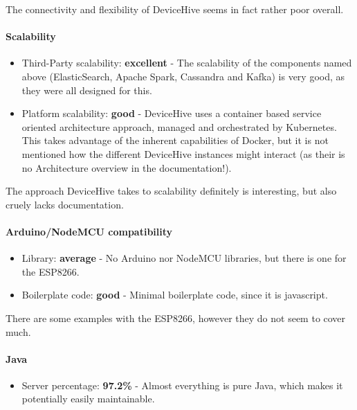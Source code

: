 \documentclass{article}
\begin{document}
The connectivity and flexibility of DeviceHive seems in fact rather poor overall.

\paragraph{Scalability}

\begin{itemize}
\item Third-Party scalability: \textbf{excellent} - The scalability of the components named above (ElasticSearch, Apache Spark, Cassandra and Kafka) is very good, as they were all designed for this.
\item Platform scalability: \textbf{good} - DeviceHive uses a container based service oriented architecture approach, managed and orchestrated by Kubernetes. This takes advantage of the inherent capabilities of Docker, but it is not mentioned how the different DeviceHive instances might interact (as their is no Architecture overview in the documentation!).
\end{itemize}

The approach DeviceHive takes to scalability definitely is interesting, but also cruely lacks documentation.

\paragraph{Arduino/NodeMCU compatibility}

\begin{itemize}
\item Library: \textbf{average} - No Arduino nor NodeMCU libraries, but there is one for the ESP8266.
\item Boilerplate code: \textbf{good} - Minimal boilerplate code, since it is javascript.
\end{itemize}

There are some examples with the ESP8266, however they do not seem to cover much.

\paragraph{Java}

\begin{itemize}
\item Server percentage: \textbf{97.2\%} - Almost everything is pure Java, which makes it potentially easily maintainable.
\end{itemize}
\end{document}
